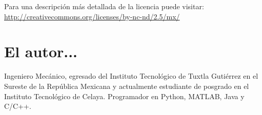 Para una descripción más detallada de la licencia puede visitar: \url{http://creativecommons.org/licenses/by-nc-nd/2.5/mx/}











\section*{El autor...}

Ingeniero Mecánico, egresado del Instituto Tecnológico de Tuxtla Gutiérrez en el Sureste de la República
Mexicana y actualmente estudiante de posgrado en el Instituto Tecnológico de Celaya. Programador en 
Python, MATLAB, Java y C/C++.\\

